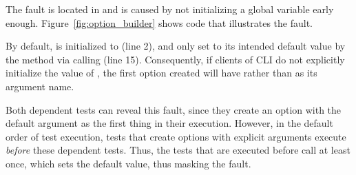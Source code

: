 

The fault is located in 
 and is caused by not initializing a global
variable early enough.
Figure~\ref{fig:option_builder} shows code that
illustrates the fault. 

%
By default,
 is initialized to  (line 2), and only set to
its intended default value  by the  method
via calling  (line 15). 
Consequently, if clients of CLI do not explicitly initialize the value of
, the first option created will have  rather
than  as its argument name.

Both dependent tests
can reveal this fault, since they create an option with 
the default argument as the first thing in their execution. However,
in the default order of test execution, 
tests that create options with explicit arguments execute \emph{before} 
these dependent tests.
Thus, the tests that are executed before call  at least once, which
sets the default  value, thus masking the fault.






